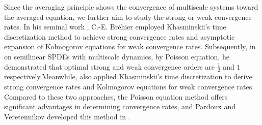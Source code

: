 \documentclass[11pt,reqno]{amsart}
\numberwithin{equation}{section}
\begin{document}
Since the averaging principle shows the convergence of multiscale systems toward the averaged equation, we further aim to study the strong or weak convergence rates. In his seminal work \cite{CEB2}, C.-E. Bréhier employed Khasminskii's time discretization method to achieve strong convergence rates and asymptotic expansion of Kolmogorov equations for weak convergence rates. 
Subsequently, in \cite{CEB} on semilinear SPDEs with multiscale dynamics, by Poisson equation, he demonstrated that optimal strong and weak convergence orders are $\frac{1}{2}$ and $1$ respectively.Meanwhile, \cite{DIR,RZK,DL} also applied Khasminskii's time discretization to derive strong convergence rates and Kolmogorov equations for weak convergence rates. Compared to these two approaches, the Poisson equation method offers significant advantages in determining convergence rates, and Pardoux and Veretennikov developed this method in \cite{EY1,EY2,EY3}.
\end{document}
